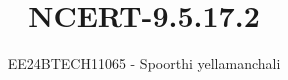 \documentclass[journal]{IEEEtran}
\begin{document}

\vspace{3cm}

\title{NCERT-9.5.17.2}
\author{EE24BTECH11065 - Spoorthi yellamanchali}
{\let\newpage\relax\maketitle}

\renewcommand{\thefigure}{\theenumi}
\renewcommand{\thetable}{\theenumi}
\setlength{\intextsep}{10pt} %


\renewcommand{\thetable}{\theenumi}
\end{document}
